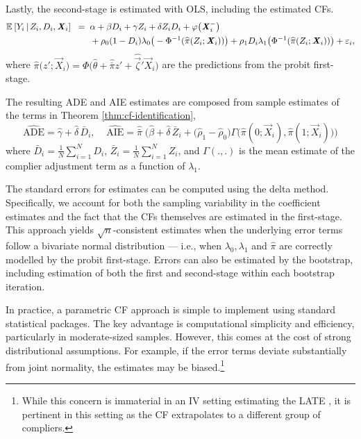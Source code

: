 Lastly, the second-stage is estimated with OLS, including the estimated CFs.
\begin{align*}
    \mathbb{E}_{} \left[ Y_i \, \middle\vert \, Z_i, D_i, \boldsymbol{\mathit{X}}_i \right] \;\; =& \;\;
        \alpha
        + \beta D_i
        + \gamma Z_i
        + \delta Z_i D_i
        + \varphi\big(\boldsymbol{\mathit{X}}_i^-\big) \\
        & \;\; + \rho_0 (1 - D_i) \lambda_0 \big( -\Phi^{-1}(\widehat{\pi}(Z_i; \boldsymbol{\mathit{X}}_i)) \big)
    + \rho_1 D_i \lambda_1\big( \Phi^{-1}(\widehat{\pi}(Z_i; \boldsymbol{\mathit{X}}_i)) \big)
    + \varepsilon_i,
\end{align*}
where $\hat\pi \big(z';\vec X_i \big) = \Phi \Big( \hat\theta + \hat{\bar\pi} z' + \hat{\vec\zeta}' \vec X_i \Big)$ are the predictions from the probit first-stage.

The resulting ADE and AIE estimates are composed from sample estimates of the terms in Theorem \ref{thm:cf-identification},
\[ \hat{\text{ADE}}
    = \hat{\gamma} + \hat{\delta}\,\bar D_i, \;\;\;\;
    \hat{\text{AIE}}
    = \hat{\bar\pi}\; \Big(
        \hat{\beta} + \hat{\delta}\,\bar Z_i 
        + \big(\hat \rho_1 - \hat \rho_0 \big)
        \Gamma \big( \hat\pi(0;\vec X_i), \hat\pi(1;\vec X_i)\big) \Big) \]
where $\bar D_i = \frac1N \sum_{i=1}^N D_i$, $\bar Z_i = \frac1N \sum_{i=1}^N Z_i$, and $\Gamma(.,.)$ is the mean estimate of the complier adjustment term as a function of $\lambda_1$.

The standard errors for estimates can be computed using the delta method.
Specifically, we account for both the sampling variability in the coefficient estimates and the fact that the CFs themselves are estimated in the first-stage.
This approach yields $\sqrt{n}$-consistent estimates when the underlying error terms follow a bivariate normal distribution --- i.e., when $\lambda_0, \lambda_1$ and $\hat\pi$ are correctly modelled by the probit first-stage.
Errors can also be estimated by the bootstrap, including estimation of both the first and second-stage within each bootstrap iteration.

In practice, a parametric CF approach is simple to implement using standard statistical packages.
The key advantage is computational simplicity and efficiency, particularly in moderate-sized samples.
However, this comes at the cost of strong distributional assumptions.
For example, if the error terms deviate substantially from joint normality, the estimates may be biased.\footnote{
    While this concern is immaterial in an IV setting estimating the LATE \citep{kline2019heckits}, it is pertinent in this setting as the CF extrapolates to a different group of compliers.
}

